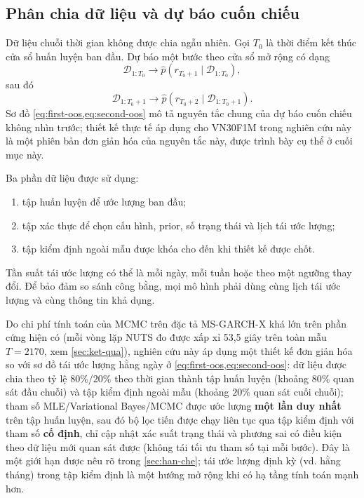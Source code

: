 \documentclass[12pt,a4paper]{article}
\numberwithin{equation}{section}
\newcommand{\Data}{\mathcal{D}}
\begin{document}
\subsection{Phân chia dữ liệu và dự báo cuốn chiếu}\label{subsec:split}

Dữ liệu chuỗi thời gian không được chia ngẫu nhiên. Gọi $T_0$ là thời điểm kết thúc cửa sổ huấn luyện ban đầu. Dự báo một bước theo cửa sổ mở rộng có dạng
\begin{equation}
  \Data_{1:T_0}
  \longrightarrow
  \widehat p(r_{T_0+1}\mid\Data_{1:T_0}),
  \label{eq:first-oos}
\end{equation}
sau đó
\begin{equation}
  \Data_{1:T_0+1}
  \longrightarrow
  \widehat p(r_{T_0+2}\mid\Data_{1:T_0+1}).
  \label{eq:second-oos}
\end{equation}
Sơ đồ \cref{eq:first-oos,eq:second-oos} mô tả nguyên tắc chung của dự báo cuốn chiếu không nhìn trước; thiết kế thực tế áp dụng cho VN30F1M trong nghiên cứu này là một phiên bản đơn giản hóa của nguyên tắc này, được trình bày cụ thể ở cuối mục này.

Ba phần dữ liệu được sử dụng:
\begin{enumerate}
  \item tập huấn luyện để ước lượng ban đầu;
  \item tập xác thực để chọn cấu hình, prior, số trạng thái và lịch tái ước lượng;
  \item tập kiểm định ngoài mẫu được khóa cho đến khi thiết kế được chốt.
\end{enumerate}

Tần suất tái ước lượng có thể là mỗi ngày, mỗi tuần hoặc theo một ngưỡng thay đổi. Để bảo đảm so sánh công bằng, mọi mô hình phải dùng cùng lịch tái ước lượng và cùng thông tin khả dụng.

Do chi phí tính toán của MCMC trên đặc tả MS-GARCH-X khá lớn trên phần cứng hiện có (mỗi vòng lặp NUTS đo được xấp xỉ 53,5 giây trên toàn mẫu $T=2170$, xem \cref{sec:ket-qua}), nghiên cứu này áp dụng một thiết kế đơn giản hóa so với sơ đồ tái ước lượng hằng ngày ở \cref{eq:first-oos,eq:second-oos}: dữ liệu được chia theo tỷ lệ $80\%$/$20\%$ theo thời gian thành tập huấn luyện (khoảng $80\%$ quan sát đầu chuỗi) và tập kiểm định ngoài mẫu (khoảng $20\%$ quan sát cuối chuỗi); tham số MLE/Variational Bayes/MCMC được ước lượng \textbf{một lần duy nhất} trên tập huấn luyện, sau đó bộ lọc tiến được chạy liên tục qua tập kiểm định với tham số \textbf{cố định}, chỉ cập nhật xác suất trạng thái và phương sai có điều kiện theo dữ liệu mới quan sát được (không tái tối ưu tham số tại mỗi bước). Đây là một giới hạn được nêu rõ trong \cref{sec:han-che}; tái ước lượng định kỳ (vd. hằng tháng) trong tập kiểm định là một hướng mở rộng khi có hạ tầng tính toán mạnh hơn.
\end{document}
